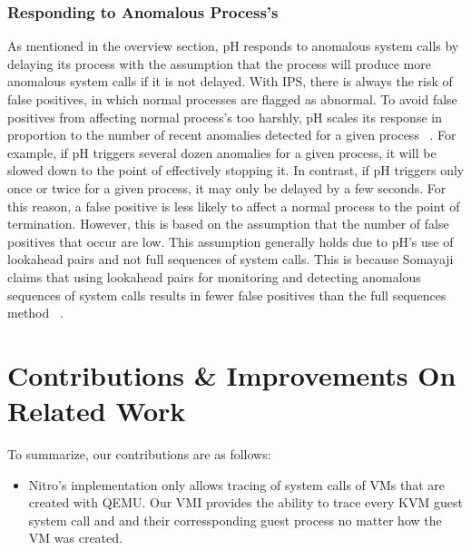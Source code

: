 \documentclass{report}
\begin{document}
\begin{spacing}{1.5}
\subsection{Responding to Anomalous Process's}


{\large
As mentioned in the overview section, pH responds to anomalous system calls by delaying its process with the assumption that the process will produce more anomalous system calls if it is not delayed. With IPS, there is always the risk of false positives, in which normal processes are flagged as abnormal. To avoid false positives from affecting normal process's too harshly, pH scales its response in proportion to the number of recent anomalies detected for a given process ~\cite{findlay2021practical}. For example, if pH triggers several dozen anomalies for a given process, it will be slowed down to the point of effectively stopping it. In contrast, if pH triggers only once or twice for a given process, it may only be delayed by a few seconds. For this reason, a false positive is less likely to affect a normal process to the point of termination. However, this is based on the assumption that the number of false positives that occur are low. This assumption generally holds due to pH's use of lookahead pairs and not full sequences of system calls. This is because Somayaji claims that using lookahead pairs for monitoring and detecting anomalous sequences of system calls results in fewer false positives than the full sequences method ~\cite{findlay2021practical}.
\leavevmode\newline
}















\chapter{Contributions \& Improvements On Related Work}

{\large
To summarize, our contributions are as follows:

\begin{itemize}
  \item Nitro's implementation only allows tracing of system calls of VMs that are created with QEMU. Our VMI provides the ability to trace every KVM guest system call and and their corressponding guest process no matter how the VM was created.


\end{itemize}}
\end{spacing}
\end{document}
